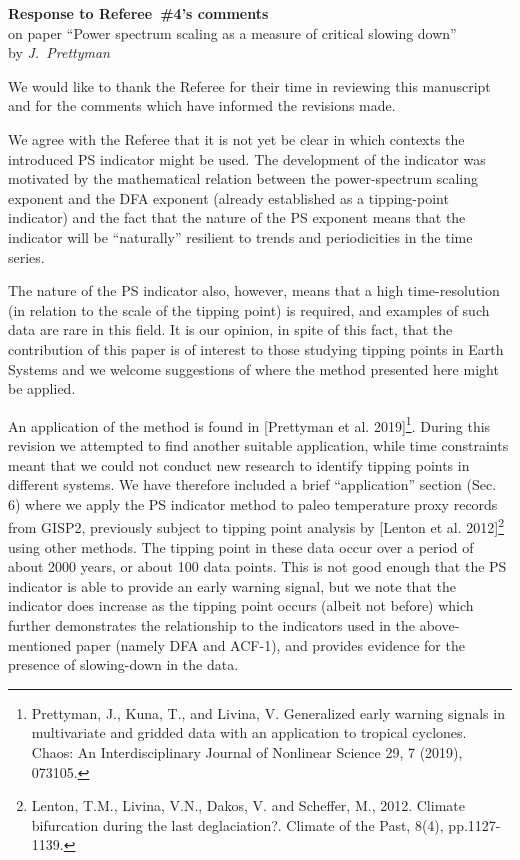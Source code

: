 \documentclass[12pt, a4paper]{article}
\begin{document}
\begin{center}
{\bf Response to Referee~\#4's comments}\\
on paper ``Power spectrum scaling as a measure of critical slowing down''\\[5pt]
by {\it J.~Prettyman}
\end{center}

\vspace{3mm}

\noindent We would like to thank the Referee for their time in reviewing this manuscript and for the comments which have informed the revisions made. 

We agree with the Referee that it is not yet be clear in which contexts the introduced PS indicator might be used. The development of the indicator was motivated by the mathematical relation between the power-spectrum scaling exponent and the DFA exponent (already established as a tipping-point indicator) and the fact that the nature of the PS exponent means that the indicator will be ``naturally'' resilient to trends and periodicities in the time series. 

The nature of the PS indicator also, however, means that a high time-resolution (in relation to the scale of the tipping point) is required, and examples of such data are rare in this field. It is our opinion, in spite of this fact, that the contribution of this paper is of interest to those studying tipping points in Earth Systems and we welcome suggestions of where the method presented here might be applied. 

An application of the method is found in [Prettyman et al. 2019]\footnote{Prettyman, J., Kuna, T., and Livina, V. Generalized early warning signals in multivariate and gridded data with an application to tropical cyclones. Chaos: An Interdisciplinary Journal of Nonlinear Science 29, 7 (2019), 073105.}. During this revision we attempted to find another suitable application, while time constraints meant that we could not conduct new research to identify tipping points in different systems. We have therefore included a brief “application” section (Sec. 6) where we apply the PS indicator method to paleo temperature proxy records from GISP2, previously subject to tipping point analysis by [Lenton et al. 2012]\footnote{‌Lenton, T.M., Livina, V.N., Dakos, V. and Scheffer, M., 2012. Climate bifurcation during the last deglaciation?. Climate of the Past, 8(4), pp.1127-1139.} using other methods. The tipping point in these data occur over a period of about 2000 years, or about 100 data points. This is not good enough that the PS indicator is able to provide an early warning signal, but we note that the indicator does increase as the tipping point occurs (albeit not before) which further demonstrates the relationship to the indicators used in the above-mentioned paper (namely DFA and ACF-1), and provides evidence for the presence of slowing-down in the data.
\end{document}
